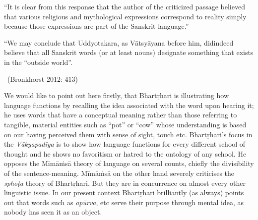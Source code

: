 \begin{myquote}
“It is clear from this response that the author of the criticized passage believed that various religious and mythological expressions correspond to reality simply because those expressions are part of the Sanskrit language.”
\end{myquote}

\begin{myquote}
“We may conclude that Uddyotakara, as Vātsyāyana before him, did\break indeed believe that all Sanskrit words (or at least nouns) designate something that exists in the “outside world”. 
\end{myquote}

\vspace{-.2cm}

\begin{myquote}

~\hfill (Bronkhorst 2012: 413)
\end{myquote}

We would like to point out here firstly, that Bhartṛhari is illustrating how language functions by recalling the idea associated with the word upon hearing it; he uses words that have a conceptual meaning rather than those referring to tangible, material entities such as “pot” or “cow” whose understanding is based on our having perceived them with sense of sight, touch etc. Bhartṛhari’s focus in the \textit{Vākyapadīya} is to show how language functions for every different school of thought and he shows no favoritism or hatred to the ontology of any school. He opposes the Mīmāṁsā theory of language on several counts, chiefly the divisibility of the sentence-meaning. Mīmāṁsā on the other hand severely criticises the \textit{sphoṭa} theory of Bhartṛhari. But they are in concurrence on almost every other linguistic issue. In our present context Bhartṛhari brilliantly (as always) points out that words such as \textit{apūrva}, etc serve their purpose through mental idea, as nobody has seen it as an object.

